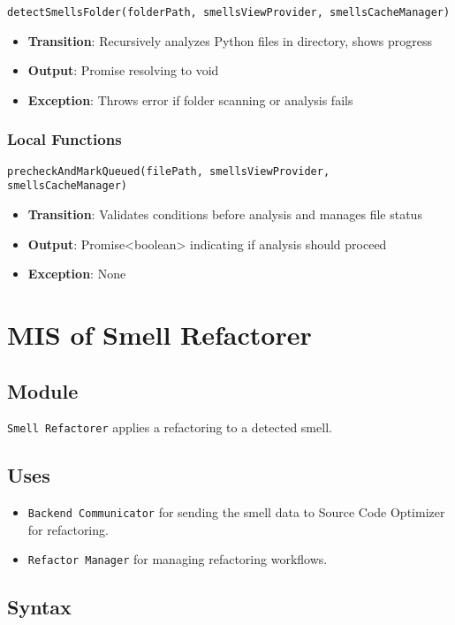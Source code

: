 \documentclass[12pt, titlepage]{article}
\begin{document}
\texttt{detectSmellsFolder(folderPath, smellsViewProvider, smellsCacheManager)}
\begin{itemize}
\item \textbf{Transition}: Recursively analyzes Python files in directory, shows progress
\item \textbf{Output}: Promise resolving to void
\item \textbf{Exception}: Throws error if folder scanning or analysis fails
\end{itemize}

\subsubsection{Local Functions}
\texttt{precheckAndMarkQueued(filePath, smellsViewProvider, smellsCacheManager)}
\begin{itemize}
\item \textbf{Transition}: Validates conditions before analysis and manages file status
\item \textbf{Output}: Promise<boolean> indicating if analysis should proceed
\item \textbf{Exception}: None
\end{itemize}

\section{MIS of Smell Refactorer}

\subsection{Module}
\texttt{Smell Refactorer} applies a refactoring to a detected smell.

\subsection{Uses}
\begin{itemize}
\item \texttt{Backend Communicator} for sending the smell data to Source Code Optimizer for refactoring.
\item \texttt{Refactor Manager} for managing refactoring workflows.
\end{itemize}

\subsection{Syntax}
\end{document}
